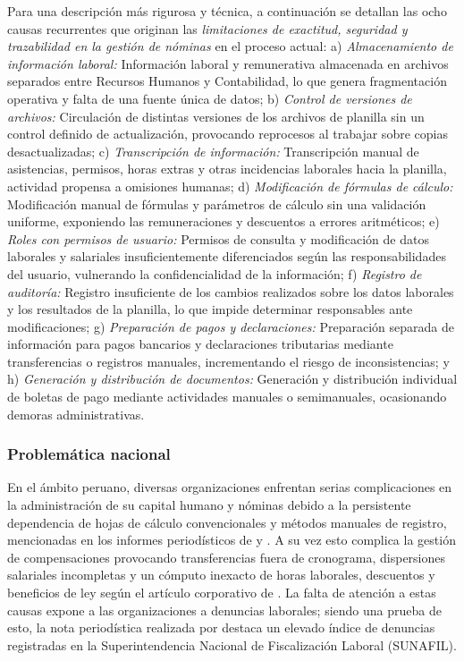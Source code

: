Para una descripción más rigurosa y técnica, a continuación se detallan las ocho causas recurrentes que originan las \textit{limitaciones de exactitud, seguridad y trazabilidad en la gestión de nóminas} en el proceso actual: 
a) \textit{Almacenamiento de información laboral:} Información laboral y remunerativa almacenada en archivos separados entre Recursos Humanos y Contabilidad, 
lo que genera fragmentación operativa y falta de una fuente única de datos; 
b) \textit{Control de versiones de archivos:} Circulación de distintas versiones de los archivos de planilla sin un control definido de actualización, 
provocando reprocesos al trabajar sobre copias desactualizadas; 
c) \textit{Transcripción de información:} Transcripción manual de asistencias, permisos, horas extras y otras incidencias laborales hacia la planilla, 
actividad propensa a omisiones humanas; 
d) \textit{Modificación de fórmulas de cálculo:} Modificación manual de fórmulas y parámetros de cálculo sin una validación uniforme, 
exponiendo las remuneraciones y descuentos a errores aritméticos; 
e) \textit{Roles con permisos de usuario:} Permisos de consulta y modificación de datos laborales y salariales insuficientemente diferenciados según las responsabilidades del usuario, 
vulnerando la confidencialidad de la información; 
f) \textit{Registro de auditoría:} Registro insuficiente de los cambios realizados sobre los datos laborales y los resultados de la planilla, 
lo que impide determinar responsables ante modificaciones; 
g) \textit{Preparación de pagos y declaraciones:} Preparación separada de información para pagos bancarios y declaraciones tributarias mediante transferencias o registros manuales, 
incrementando el riesgo de inconsistencias; y 
h) \textit{Generación y distribución de documentos:} Generación y distribución individual de boletas de pago mediante actividades manuales o semimanuales, 
ocasionando demoras administrativas.

\subsubsection{Problemática nacional}

En el ámbito peruano, diversas organizaciones enfrentan serias complicaciones en la administración de su capital humano y nóminas debido a la persistente dependencia 
de hojas de cálculo convencionales y métodos manuales de registro, mencionadas en los informes periodísticos de \textcite{elperuano2026} y \textcite{esquivel2025impacto}.
A su vez esto complica la gestión de compensaciones provocando transferencias fuera de cronograma, dispersiones salariales incompletas y un cómputo inexacto de horas laborales, 
descuentos y beneficios de ley según el artículo corporativo de \textcite{grupoono2026errores}.
La falta de atención a estas causas expone a las organizaciones a denuncias laborales; siendo una prueba de esto, la nota periodística realizada por \textcite{contadores360_2026_sunafil} 
destaca un elevado índice de denuncias registradas en la Superintendencia Nacional de Fiscalización Laboral (SUNAFIL).

